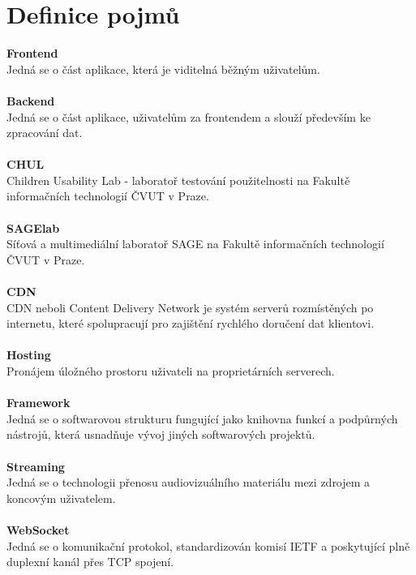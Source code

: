 \documentclass[thesis=M,czech]{FITthesis}[2012/06/26]
\begin{document}
\section{Definice pojmů} \label{sec:analyza_definice_pojmu}
\textbf{Frontend}\\
Jedná se o část aplikace, která je viditelná běžným uživatelům.\\ \\
\textbf{Backend}\\
Jedná se o část aplikace, uživatelům  za frontendem a slouží především ke zpracování dat.\\ \\
\textbf{CHUL}\\
Children Usability Lab - laboratoř testování použitelnosti na Fakultě informačních technologií ČVUT v Praze.\\ \\
\textbf{SAGElab}\\
Síťová a multimediální laboratoř SAGE na Fakultě informačních technologií ČVUT v Praze.\\ \\
\textbf{CDN}\\
CDN neboli Content Delivery Network je systém serverů rozmístěných po internetu, které spolupracují pro zajištění rychlého doručení dat klientovi.\\ \\
\textbf{Hosting}\\
Pronájem úložného prostoru uživateli na proprietárních serverech.\\ \\
\textbf{Framework}\\
Jedná se o softwarovou strukturu fungující jako knihovna funkcí a podpůrných nástrojů, která usnadňuje vývoj jiných softwarových projektů.\\ \\
\textbf{Streaming}\\
 Jedná se o technologii přenosu audiovizuálního materiálu mezi zdrojem a koncovým uživatelem.\\ \\
\textbf{WebSocket}\\
Jedná se o komunikační protokol, standardizován komisí IETF a poskytující plně duplexní kanál přes TCP spojení. \\ \\
\end{document}
